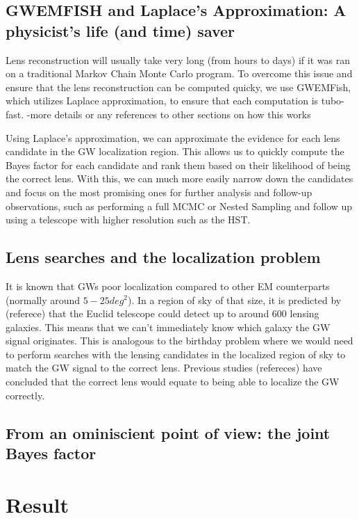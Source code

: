 \documentclass[pdflatex,sn-mathphys-num]{sn-jnl}%
\theoremstyle{thmstyleone}%
\theoremstyle{thmstyletwo}%
\theoremstyle{thmstylethree}%
\begin{document}
\subsection{GWEMFISH and Laplace's Approximation: A physicist's life (and time) saver}

Lens reconstruction will usually take very long (from hours to days) if it was ran on a traditional Markov Chain Monte Carlo program. To overcome this issue and ensure that the lens reconstruction can be computed quicky, we use GWEMFish, which utilizes Laplace approximation, to ensure that each computation is tubo-fast. 
-more details or any references to other sections on how this works

Using Laplace's approximation, we can approximate the evidence for each lens candidate in the GW localization region. This allows us to quickly compute the Bayes factor for each candidate and rank them based on their likelihood of being the correct lens. With this, we can much more easily narrow down the candidates and focus on the most promising ones for further analysis and follow-up observations, such as performing a full MCMC or Nested Sampling and follow up using a telescope with higher resolution such as the HST.

\subsection{Lens searches and the localization problem}
It is known that GWs poor localization compared to other EM counterparts (normally around $5-25 deg^2$). In a region of sky of that size, it is predicted by (referece) that the Euclid telescope could detect up to around 600 lensing galaxies. This means that we can't immediately know which galaxy the GW signal originates. This is analogous to the birthday problem where we would need to perform searches with the lensing candidates in the localized region of sky to match the GW signal to the correct lens. Previous studies (refereces) have concluded that the correct lens would equate to being able to localize the GW correctly.


\subsection{From an ominiscient point of view: the joint Bayes factor}


\section{Result}
\end{document}
